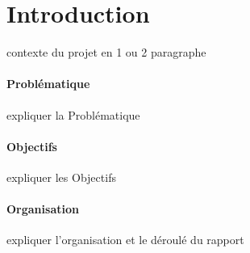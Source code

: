 \section{Introduction} 

contexte du projet en 1 ou 2 paragraphe

\paragraph{Problématique}
expliquer la Problématique

\paragraph{Objectifs}
expliquer les Objectifs

\paragraph{Organisation}
expliquer l'organisation et le déroulé du rapport